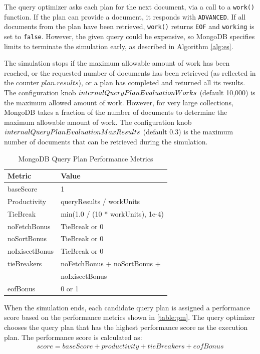 The query optimizer asks each plan for the next document, via a call to a \verb|work()| function. If the plan can provide a document, it responds with \verb|ADVANCED|. If all documents from the plan have been retrieved, \verb|work()| returns \verb|EOF| and \verb|working| is set to \verb|false|. However, the given query could be expensive, so MongoDB specifies limits to terminate the simulation early, as described in Algorithm \ref{alg:es}.

The simulation stops if the maximum allowable amount of work has been reached, or the requested number of documents has been retrieved (as reflected in the counter $plan.results$), or a plan has completed and returned all its results. The configuration knob $internal\-Query\-Plan\-Evaluation\-Works$ (default 10,000) is the maximum allowed amount of work. However, for very large collections, MongoDB takes a fraction of the number of documents to determine the maximum allowable amount of work. The configuration knob $internal\-Query\-Plan\-Evaluation\-Max\-Results$ (default 0.3) is the maximum number of documents that can be retrieved during the simulation.

\begin{table}[htb]
    \begin{tabular}{ll}
        \toprule
        Metric         & Value\\
        \midrule
        baseScore      & 1                                           \\
        Productivity   & queryResults / workUnits                    \\
        TieBreak       & min(1.0 / (10 * workUnits), 1e-4)           \\
        noFetchBonus   & TieBreak or 0                               \\
        noSortBonus    & TieBreak or 0                               \\
        noIxisectBonus & TieBreak or 0                               \\
        tieBreakers    & noFetchBonus + noSortBonus + \\
                       & noIxisectBonus \\
        eofBonus       & 0 or 1\\
        \bottomrule
    \end{tabular}
    \caption{MongoDB Query Plan Performance Metrics}
    \label{table:pm}
\end{table}

When the simulation ends, each candidate query plan is assigned a performance score based on the performance metrics shown in \autoref{table:pm}. The query optimizer chooses the query plan that has the highest performance score as the execution plan. The performance score is calculated as:
\begin{align}
 score = baseScore + productivity + tieBreakers + eofBonus
\end{align}

